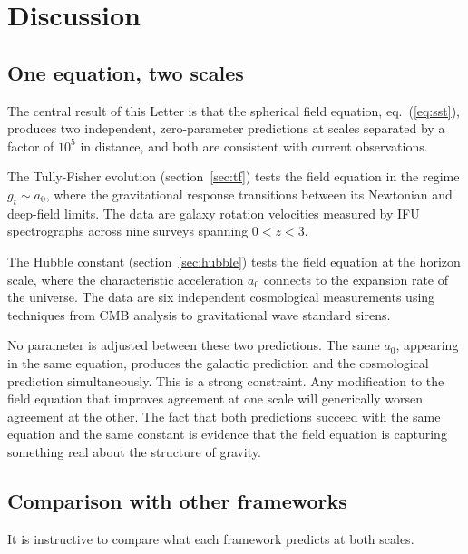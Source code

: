\documentclass[a4paper,11pt]{article}
\begin{document}
\section{Discussion}
\label{sec:discussion}

\subsection{One equation, two scales}

The central result of this Letter is that the spherical field equation, eq.~(\ref{eq:sst}), produces two independent, zero-parameter predictions at scales separated by a factor of $10^5$ in distance, and both are consistent with current observations.

The Tully-Fisher evolution (section~\ref{sec:tf}) tests the field equation in the regime $g_t \sim a_0$, where the gravitational response transitions between its Newtonian and deep-field limits. The data are galaxy rotation velocities measured by IFU spectrographs across nine surveys spanning $0 < z < 3$.

The Hubble constant (section~\ref{sec:hubble}) tests the field equation at the horizon scale, where the characteristic acceleration $a_0$ connects to the expansion rate of the universe. The data are six independent cosmological measurements using techniques from CMB analysis to gravitational wave standard sirens.

No parameter is adjusted between these two predictions. The same $a_0$, appearing in the same equation, produces the galactic prediction and the cosmological prediction simultaneously. This is a strong constraint. Any modification to the field equation that improves agreement at one scale will generically worsen agreement at the other. The fact that both predictions succeed with the same equation and the same constant is evidence that the field equation is capturing something real about the structure of gravity.

\subsection{Comparison with other frameworks}

It is instructive to compare what each framework predicts at both scales.
\end{document}
